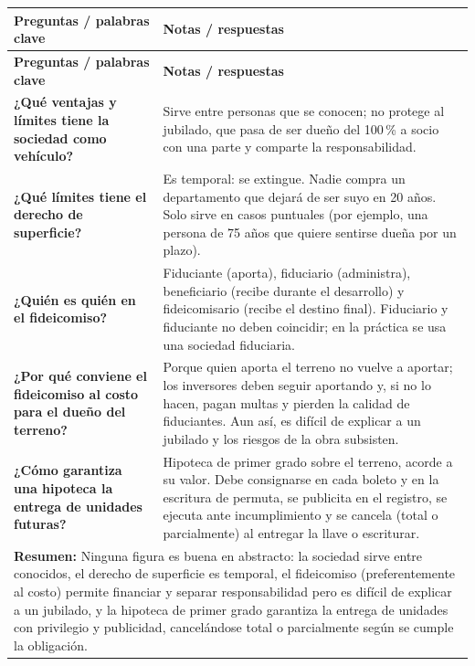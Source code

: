 \documentclass[12pt,oneside]{book}
\newcommand{\cornellresumen}[1]{%
  \multicolumn{2}{p{\dimexpr0.89\textwidth+2\tabcolsep\relax}}{\textbf{Resumen:} #1}\\}
\begin{document}
\begin{longtable}{p{}p{}}
\toprule
\textbf{Preguntas / palabras clave} & \textbf{Notas / respuestas} \\
\midrule
\endfirsthead
\toprule
\textbf{Preguntas / palabras clave} & \textbf{Notas / respuestas} \\
\midrule
\endhead

\textbf{¿Qué ventajas y límites tiene la sociedad como vehículo?} &
Sirve entre personas que se conocen; no protege al jubilado, que pasa de ser dueño del 100\,\% a socio con una parte y comparte la responsabilidad. \\[0.6em]

\textbf{¿Qué límites tiene el derecho de superficie?} &
Es temporal: se extingue. Nadie compra un departamento que dejará de ser suyo en 20 años. Solo sirve en casos puntuales (por ejemplo, una persona de 75 años que quiere sentirse dueña por un plazo). \\[0.6em]

\textbf{¿Quién es quién en el fideicomiso?} &
Fiduciante (aporta), fiduciario (administra), beneficiario (recibe durante el desarrollo) y fideicomisario (recibe el destino final). Fiduciario y fiduciante no deben coincidir; en la práctica se usa una sociedad fiduciaria. \\[0.6em]

\textbf{¿Por qué conviene el fideicomiso al costo para el dueño del terreno?} &
Porque quien aporta el terreno no vuelve a aportar; los inversores deben seguir aportando y, si no lo hacen, pagan multas y pierden la calidad de fiduciantes. Aun así, es difícil de explicar a un jubilado y los riesgos de la obra subsisten. \\[0.6em]

\textbf{¿Cómo garantiza una hipoteca la entrega de unidades futuras?} &
Hipoteca de primer grado sobre el terreno, acorde a su valor. Debe consignarse en cada boleto y en la escritura de permuta, se publicita en el registro, se ejecuta ante incumplimiento y se cancela (total o parcialmente) al entregar la llave o escriturar. \\

\midrule
\cornellresumen{Ninguna figura es buena en abstracto: la sociedad sirve entre conocidos, el derecho de superficie es temporal, el fideicomiso (preferentemente al costo) permite financiar y separar responsabilidad pero es difícil de explicar a un jubilado, y la hipoteca de primer grado garantiza la entrega de unidades con privilegio y publicidad, cancelándose total o parcialmente según se cumple la obligación.}
\bottomrule
\end{longtable}
\end{document}
